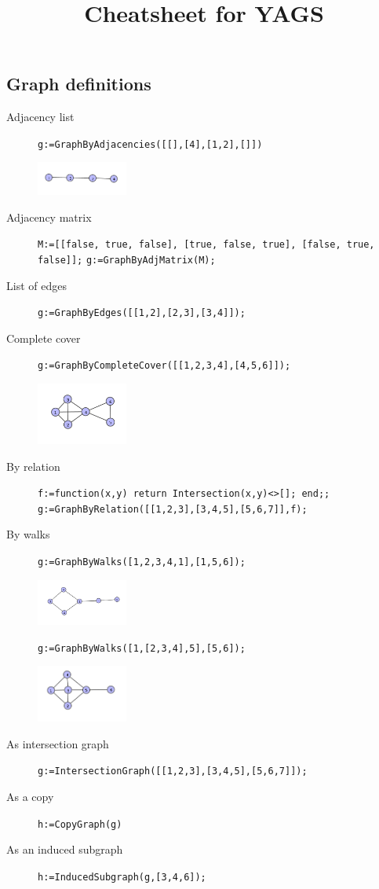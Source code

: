 \documentclass[11pt]{article}
\date{}
\title{Cheatsheet for YAGS}
\begin{document}
\maketitle
\begin{multicols}{3}
\scriptsize
\thispagestyle{empty}

\section{Graph definitions}
\label{sec:orgde2a8c9}

\begin{description}
\item[{Adjacency list}] \texttt{g:=GraphByAdjacencies([[],[4],[1,2],[]])}

\includegraphics[width=3cm]{bylist.png}
\item[{Adjacency matrix}] \texttt{M:=[[false, true, false], [true, false, true], [false, true, false]];}
\texttt{g:=GraphByAdjMatrix(M);}
\item[{List of edges}] \texttt{g:=GraphByEdges([[1,2],[2,3],[3,4]]);}
\item[{Complete cover}] \texttt{g:=GraphByCompleteCover([[1,2,3,4],[4,5,6]]);}

\includegraphics[width=3cm]{bycomplete.png}
\item[{By relation}] \texttt{f:=function(x,y) return Intersection(x,y)<>[]; end;;}
\texttt{g:=GraphByRelation([[1,2,3],[3,4,5],[5,6,7]],f);}
\item[{By walks}] \texttt{g:=GraphByWalks([1,2,3,4,1],[1,5,6]);} 

\includegraphics[width=3cm]{bywalks.png}

\texttt{g:=GraphByWalks([1,[2,3,4],5],[5,6]);}

\includegraphics[width=3cm]{bywalks2.png}
\item[{As intersection graph}] \texttt{g:=IntersectionGraph([[1,2,3],[3,4,5],[5,6,7]]);}
\item[{As a copy}] \texttt{h:=CopyGraph(g)}
\item[{As an induced subgraph}] \texttt{h:=InducedSubgraph(g,[3,4,6]);}
\end{description}


\end{multicols}
\end{document}
